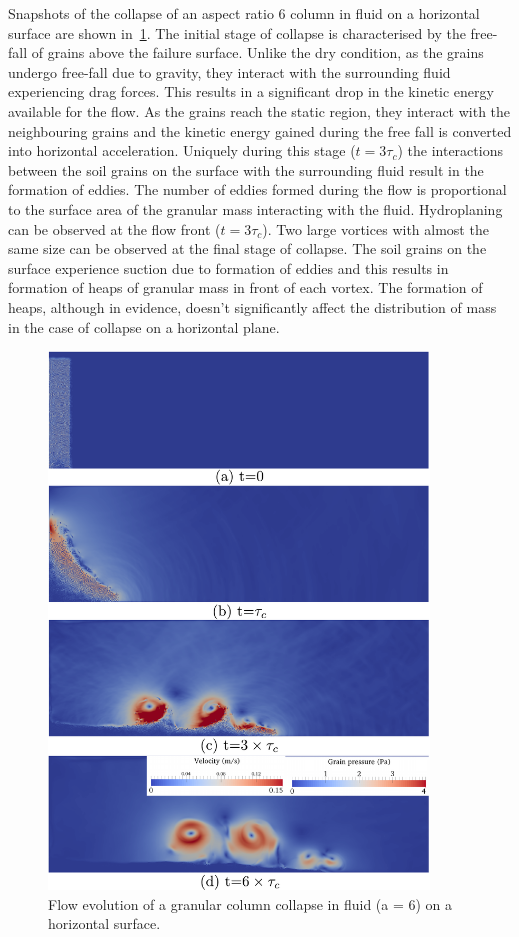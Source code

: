 Snapshots of the collapse of an aspect ratio 6 column in fluid on a horizontal 
surface are shown in~\cref{fig:LBM_DEM_a6}. The initial stage of collapse is 
characterised by the free-fall of grains above the failure surface. Unlike the 
dry condition, as the grains undergo free-fall due to gravity, they interact 
with the surrounding fluid experiencing drag forces. This results in a 
significant drop in the kinetic energy available for the flow. As the grains 
reach the static region, they interact with the neighbouring grains and the 
kinetic energy gained during the free fall is converted into horizontal 
acceleration. Uniquely during this stage ($t = 3\tau_c$) the interactions 
between the soil grains on the surface with the surrounding fluid result in the 
formation of eddies. The number of eddies formed during the flow is 
proportional to the surface area of the granular mass interacting with the 
fluid. Hydroplaning can be observed at the flow front ($t = 3\tau_c$). Two 
large vortices with almost the same size can be observed at the final stage of 
collapse. The soil grains on the surface experience suction due to formation of 
eddies and this results in formation of heaps of granular mass in front of each 
vortex. The formation of heaps, although in evidence, doesn't significantly 
affect the distribution of mass in the case of collapse on a horizontal plane. 

\begin{figure}[htpb]
\centering
\includegraphics[width=0.9\textwidth]{LBM_DEM_a6}
\caption{Flow evolution of a granular column collapse in fluid (a = 6) on a 
horizontal surface.}
\label{fig:LBM_DEM_a6}
\end{figure}


